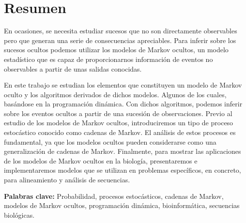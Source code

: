 \chapter*{Resumen}
En ocasiones, se necesita estudiar sucesos que no son directamente observables pero que generan una serie de consecuencias apreciables. Para inferir sobre los sucesos ocultos podemos utilizar los modelos de Markov ocultos, un modelo estadístico que es capaz de proporcionarnos información de eventos no observables a partir de unas salidas conocidas. 

En este trabajo se estudian los elementos que constituyen un modelo de Markov oculto y los algoritmos derivados de dichos modelos. Algunos de los cuales, basándose en la  programación dinámica. Con dichos algoritmos, podemos inferir sobre los eventos ocultos a partir de una sucesión de observaciones. Previo al estudio de los modelos de Markov ocultos, introduciremos un tipo de proceso estocástico conocido como cadenas de Markov. El análisis de estos procesos es fundamental, ya que los modelos ocultos pueden considerarse como una generalización de cadenas de Markov. Finalmente, para mostrar las aplicaciones de los modelos de Markov ocultos en la biología, presentaremos e implementaremos modelos que se utilizan en problemas específicos, en concreto, para alineamiento y análisis de secuencias.

\textbf{Palabras clave:} Probabilidad, procesos estocásticos, cadenas de Markov, modelos de Markov ocultos, programación dinámica, bioinformática, secuencias biológicas.